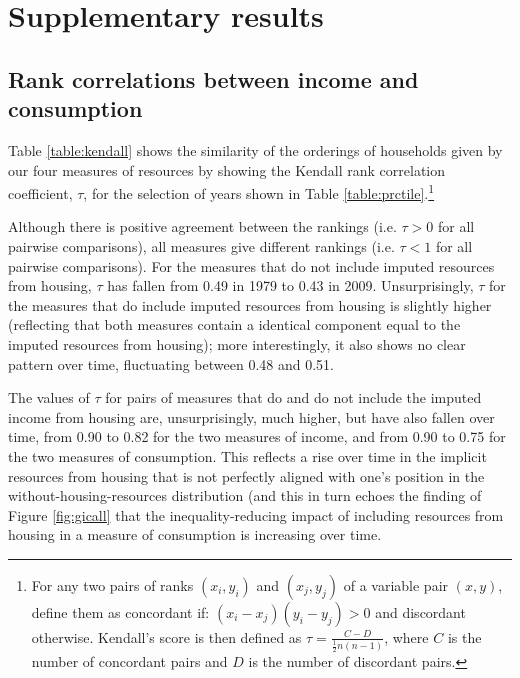 \section{Supplementary results} \label{sec:annex_results}

\subsection{Rank correlations between income and consumption}


Table \ref{table:kendall} shows the similarity of the orderings of households given by our four measures of resources by showing the Kendall rank correlation coefficient, $\tau$, for the selection of years shown in Table \ref{table:prctile}.\footnote{For any two pairs of ranks $(x_{i},y_{i})$ and $(x_{j},y_{j})$ of a variable pair $(x, y)$, define them as concordant if: $(x_{i}-x_{j})(y_{i} - y_{j}) > 0$ and discordant otherwise. Kendall's score is then defined as $\tau = \frac{C-D}{\frac{1}{2}n(n-1)}$, where $C$ is the number of concordant pairs and $D$ is the number of discordant pairs.}

Although there is positive agreement between the rankings (i.e. $\tau>0$ for all pairwise comparisons), all measures give different rankings (i.e. $\tau<1$ for all pairwise comparisons). For the measures that do not include imputed resources from housing, $\tau$ has fallen from 0.49 in 1979 to 0.43 in 2009. Unsurprisingly, $\tau$ for the measures that do include imputed resources from housing is slightly higher (reflecting that both measures contain a identical component equal to the imputed resources from housing); more interestingly, it also shows no clear pattern over time, fluctuating between 0.48 and 0.51.

The values of $\tau$ for pairs of measures that do and do not include the imputed income from housing are, unsurprisingly, much higher, but have also fallen over time, from 0.90 to 0.82 for the two measures of income, and from 0.90 to 0.75 for the two measures of consumption. This reflects a rise over time in the implicit resources from housing that is not perfectly aligned with one's position in the without-housing-resources distribution (and this in turn echoes the finding of Figure \ref{fig:gicall} that the inequality-reducing impact of including resources from housing in a measure of consumption is increasing over time.

